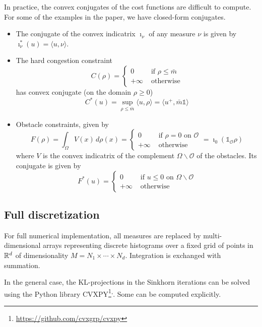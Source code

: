 \documentclass[../report.tex]{subfiles}
\begin{document}
\begin{remark}\label{rem:ConvexConj}
	In practice, the convex conjugates of the cost functions are difficult to compute. For some of the examples in the paper, we have closed-form conjugates.
	\begin{itemize}
		\item The conjugate of the convex indicatrix $\imath_{\nu}$ of any measure $\nu$ is given by $\imath_{\nu}^*(u) = \langle u, \nu\rangle$.
		\item The hard congestion constraint
		\[
		C(\rho) = \begin{cases}
		0&\text{ if }\rho\leq \bar{m} \\
		+\infty&\text{ otherwise}
		\end{cases}
		\]
		has convex conjugate (on the domain $\rho \geq 0$)
		\[
		C^*(u) = \sup_{\rho\leq \bar{m}}{} \langle u, \rho\rangle = \langle u^{+}, \bar{m}\mathds{1}\rangle
		\]
		\item Obstacle constraints, given by
		\[
		F(\rho) = \int_\Omega V(x)\,d\rho(x) =
		\begin{cases}
		0 & \text{ if } \rho = 0\text{ on }\mathscr{O} \\
		+\infty & \text{ otherwise}
		\end{cases}
		= \imath_{0}(\mathds{1}_{\mathscr{O}}\rho)
		\]
		where $V$ is the convex indicatrix of the complement $\Omega\backslash\mathscr{O}$ of the obstacles. Its conjugate is given by
		\[
		F^*(u) =
		\begin{cases}
		0& \text{ if } u \leq 0\text{ on } \Omega\backslash\mathscr{O} \\
		+\infty& \text{ otherwise}
		\end{cases}
		\]
	\end{itemize}
\end{remark}



\subsection{Full discretization}

For full numerical implementation, all measures are replaced by multi-dimensional arrays representing discrete histograms over a fixed grid of points in $\mathbb{R}^d$ of dimensionality $M = N_1\times\cdots\times N_d$. Integration is exchanged with summation.

In the general case, the KL-projections in the Sinkhorn iterations can be solved using the Python library CVXPY\footnote{\url{https://github.com/cvxgrp/cvxpy}}\textsuperscript{,}. Some can be computed explicitly.
\end{document}

